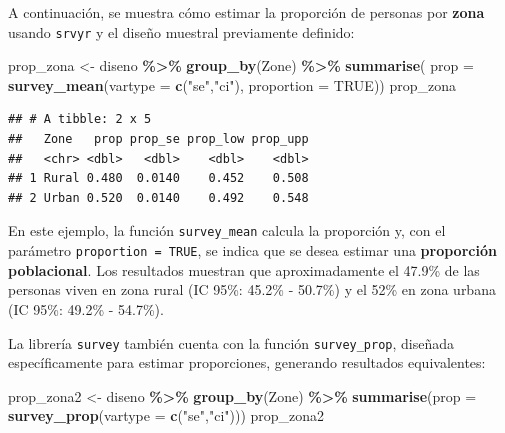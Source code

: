 \documentclass[
  12pt,
]{book}
\newenvironment{Shaded}{\begin{snugshade}}{\end{snugshade}}
\newcommand{\AttributeTok}[1]{\textcolor[rgb]{0.13,0.29,0.53}{#1}}
\newcommand{\ConstantTok}[1]{\textcolor[rgb]{0.56,0.35,0.01}{#1}}
\newcommand{\FunctionTok}[1]{\textcolor[rgb]{0.13,0.29,0.53}{\textbf{#1}}}
\newcommand{\NormalTok}[1]{#1}
\newcommand{\OtherTok}[1]{\textcolor[rgb]{0.56,0.35,0.01}{#1}}
\newcommand{\SpecialCharTok}[1]{\textcolor[rgb]{0.81,0.36,0.00}{\textbf{#1}}}
\newcommand{\StringTok}[1]{\textcolor[rgb]{0.31,0.60,0.02}{#1}}
\begin{document}
A continuación, se muestra cómo estimar la proporción de personas por \textbf{zona} usando \texttt{srvyr} y el diseño muestral previamente definido:

\begin{Shaded}
\begin{Highlighting}[]
\NormalTok{prop\_zona }\OtherTok{\textless{}{-}}\NormalTok{ diseno }\SpecialCharTok{\%\textgreater{}\%} \FunctionTok{group\_by}\NormalTok{(Zone) }\SpecialCharTok{\%\textgreater{}\%} 
             \FunctionTok{summarise}\NormalTok{(}
               \AttributeTok{prop =} \FunctionTok{survey\_mean}\NormalTok{(}\AttributeTok{vartype =} \FunctionTok{c}\NormalTok{(}\StringTok{"se"}\NormalTok{,}\StringTok{"ci"}\NormalTok{), }
                                  \AttributeTok{proportion =} \ConstantTok{TRUE}\NormalTok{))}
\NormalTok{prop\_zona}
\end{Highlighting}
\end{Shaded}

\begin{verbatim}
## # A tibble: 2 x 5
##   Zone   prop prop_se prop_low prop_upp
##   <chr> <dbl>   <dbl>    <dbl>    <dbl>
## 1 Rural 0.480  0.0140    0.452    0.508
## 2 Urban 0.520  0.0140    0.492    0.548
\end{verbatim}

En este ejemplo, la función \texttt{survey\_mean} calcula la proporción y, con el parámetro \texttt{proportion\ =\ TRUE}, se indica que se desea estimar una \textbf{proporción poblacional}. Los resultados muestran que aproximadamente el 47.9\% de las personas viven en zona rural (IC 95\%: 45.2\% - 50.7\%) y el 52\% en zona urbana (IC 95\%: 49.2\% - 54.7\%).

La librería \texttt{survey} también cuenta con la función \texttt{survey\_prop}, diseñada específicamente para estimar proporciones, generando resultados equivalentes:

\begin{Shaded}
\begin{Highlighting}[]
\NormalTok{prop\_zona2 }\OtherTok{\textless{}{-}}\NormalTok{ diseno }\SpecialCharTok{\%\textgreater{}\%} \FunctionTok{group\_by}\NormalTok{(Zone) }\SpecialCharTok{\%\textgreater{}\%} 
               \FunctionTok{summarise}\NormalTok{(}\AttributeTok{prop =} \FunctionTok{survey\_prop}\NormalTok{(}\AttributeTok{vartype =} \FunctionTok{c}\NormalTok{(}\StringTok{"se"}\NormalTok{,}\StringTok{"ci"}\NormalTok{)))}
\NormalTok{prop\_zona2}
\end{Highlighting}
\end{Shaded}
\end{document}
